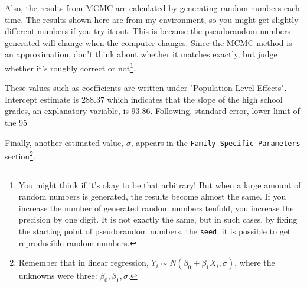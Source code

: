 \documentclass{ltjbook}
\begin{document}
Also, the results from MCMC are calculated by generating random numbers each time. The results shown here are from my environment, so you might get slightly different numbers if you try it out. This is because the pseudorandom numbers generated will change when the computer changes. Since the MCMC method is an approximation, don't think about whether it matches exactly, but judge whether it's roughly correct or not\footnote{You might think if it's okay to be that arbitrary! But when a large amount of random numbers is generated, the results become almost the same. If you increase the number of generated random numbers tenfold, you increase the precision by one digit. It is not exactly the same, but in such cases, by fixing the starting point of pseudorandom numbers, the \texttt{seed}, it is possible to get reproducible random numbers.}.

These values such as coefficients are written under "Population-Level Effects". Intercept estimate is 288.37 which indicates that the slope of the high school grades, an explanatory variable, is 93.86. Following, standard error, lower limit of the 95%

Finally, another estimated value, $\sigma$, appears in the \texttt{Family Specific Parameters} section\footnote{Remember that in linear regression, $Y_i \sim N(\beta_0 + \beta_1 X_i , \sigma)$, where the unknowns were three: $\beta_0,\beta_1,\sigma$.}.
\end{document}
